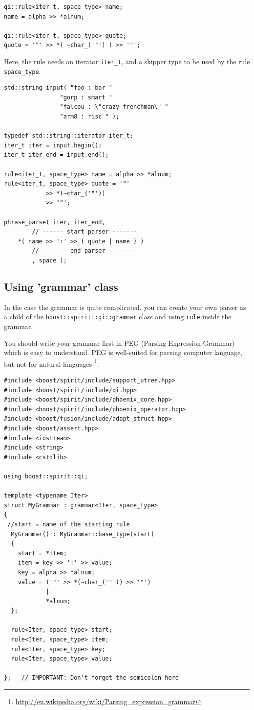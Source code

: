 \begin{verbatim}
qi::rule<iter_t, space_type> name;
name = alpha >> *alnum;

qi::rule<iter_t, space_type> quote;
quote = '"' >> *( ~char_('"') ) >> '"';
\end{verbatim}
Here, the rule needs an iterator \verb!iter_t!, and a skipper type to be used by
the rule \verb!space_type!.
\begin{verbatim}
std::string input( "foo : bar "
				"gorp : smart "
				"falcou : \"crazy frenchman\" "
				"arm8 : risc " );

typedef std::string::iterator iter_t;
iter_t iter = input.begin();
iter_t iter_end = input.end();

rule<iter_t, space_type> name = alpha >> *alnum;
rule<iter_t, space_type> quote = '"'
			>> *(~char_('"'))
			>> '"';

phrase_parse( iter, iter_end,
		// ------ start parser -------
	*( name >> ':' >> ( quote | name ) )
		// ------- end parser --------
		, space );
\end{verbatim}


\subsection{Using 'grammar' class}

In the case the grammar is quite complicated, you can create your own parser as
a child of the \verb!boost::spirit::qi::grammar! class and using \verb!rule!
inside the grammar.

You should write your grammar first in PEG (Parsing Expression Grammar) which is
easy to understand. PEG is well-suited for parsing computer language, but not
for natural languages
\footnote{\url{http://en.wikipedia.org/wiki/Parsing_expression_grammar}}.

\begin{verbatim}
#include <boost/spirit/include/support_utree.hpp>
#include <boost/spirit/include/qi.hpp>
#include <boost/spirit/include/phoenix_core.hpp>
#include <boost/spirit/include/phoenix_operator.hpp>
#include <boost/fusion/include/adapt_struct.hpp>
#include <boost/assert.hpp>
#include <iostream>
#include <string>
#include <cstdlib>

using boost::spirit::qi;

template <typename Iter>
struct MyGrammar : grammar<Iter, space_type>
{
 //start = name of the starting rule
  MyGrammar() : MyGrammar::base_type(start)
  {
    start = *item;
    item = key >> ':' >> value;
    key = alpha >> *alnum;
    value = ('"' >> *(~char_('"')) >> '"')
            |
            *alnum;
  };

  rule<Iter, space_type> start;
  rule<Iter, space_type> item;
  rule<Iter, space_type> key;
  rule<Iter, space_type> value;
  
};   // IMPORTANT: Don't forget the semicolon here
\end{verbatim}

